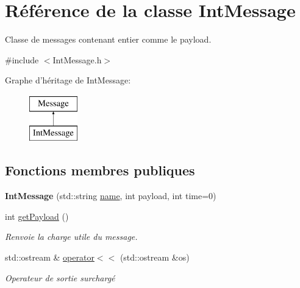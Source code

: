 \hypertarget{classIntMessage}{\section{Référence de la classe Int\-Message}
\label{classIntMessage}
}


Classe de messages contenant entier comme le payload.  




{\ttfamily \#include $<$Int\-Message.\-h$>$}

Graphe d'héritage de Int\-Message\-:\begin{figure}[H]
\begin{center}
\leavevmode
\includegraphics[height=2.000000cm]{classIntMessage}
\end{center}
\end{figure}
\subsection*{Fonctions membres publiques}
\begin{DoxyCompactItemize}
\item 
\hypertarget{classIntMessage_aae52ad3c838b48d6512eea7ffbb89404}{{\bfseries Int\-Message} (std\-::string \hyperlink{classMessage_ac7adddb666acdc47c48f684bd6810a51}{name}, int payload, int time=0)}\label{classIntMessage_aae52ad3c838b48d6512eea7ffbb89404}

\item 
\hypertarget{classIntMessage_a00d3fe88985495e98725c12bfc21c39d}{int \hyperlink{classIntMessage_a00d3fe88985495e98725c12bfc21c39d}{get\-Payload} ()}\label{classIntMessage_a00d3fe88985495e98725c12bfc21c39d}

\begin{DoxyCompactList}\small\item\em Renvoie la charge utile du message. \end{DoxyCompactList}\item 
\hypertarget{classIntMessage_a222a5ba75846757bfc24cea19ce345ed}{std\-::ostream \& \hyperlink{classIntMessage_a222a5ba75846757bfc24cea19ce345ed}{operator$<$$<$} (std\-::ostream \&os)}\label{classIntMessage_a222a5ba75846757bfc24cea19ce345ed}

\begin{DoxyCompactList}\small\item\em Operateur de sortie surchargé \end{DoxyCompactList}\end{DoxyCompactItemize}
